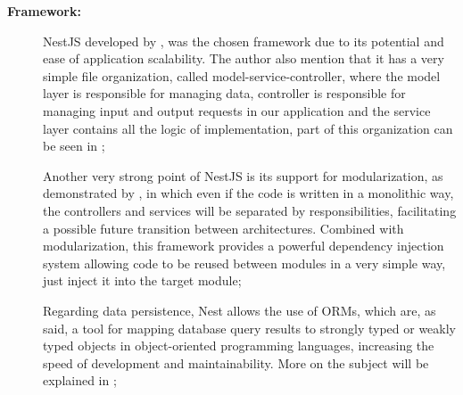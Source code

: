 \begin{description}
    \item[\textbf{Framework:}] NestJS developed by \textcite{nestDocs}, was the chosen framework due to its potential and ease of application scalability. The author also mention that it has a very simple file organization, called model-service-controller, where the model layer is responsible for managing data, controller is responsible for managing input and output requests in our application and the service layer contains all the logic of implementation, part of this organization can be seen in ;
    
    
    Another very strong point of NestJS is its support for modularization, as demonstrated by \textcite{nestDocs},  in which even if the code is written in a monolithic way, the controllers and services will be separated by responsibilities, facilitating a possible future transition between architectures. Combined with modularization, this framework provides a powerful dependency injection system allowing code to be reused between modules in a very simple way, just inject it into the target module;
    
    
    Regarding data persistence, Nest allows the use of \acp{ORM}, which are, as \textcite{Wiphusitphunpol_2017} said, a tool for mapping database query results to strongly typed or weakly typed objects in object-oriented programming languages, increasing the speed of development and maintainability. More on the subject will be explained in ;
    

\end{description}
